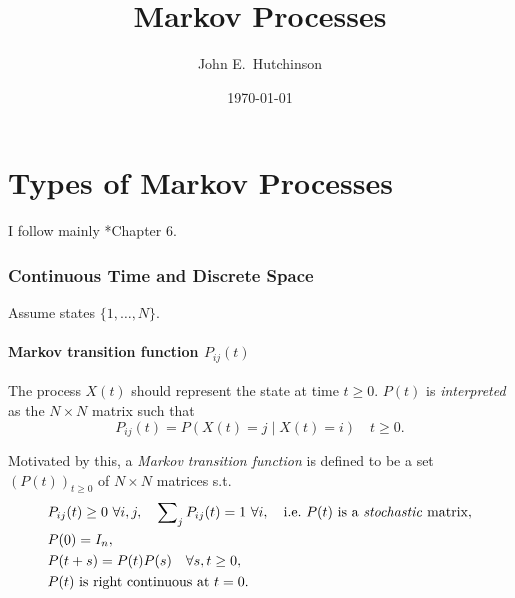 \documentclass[a4paper]{amsart}
\theoremstyle{plain}
\theoremstyle{definition}
\theoremstyle{remark}
\begin{document}
\title{Markov Processes}  
\author{John E.\ Hutchinson}
\date{\today}

\maketitle




\tableofcontents

\newpage \part{Types of Markov Processes}

I follow mainly \cite{Lam}*{Chapter  6}.

\section{\textbf{Continuous Time and Discrete Space}}

Assume states  $ \{1,\dots, N\}$. 

\subsection{Markov transition function $ P_{ij}(t) $ }
The process $ X(t) $ should represent the state at time $ t \geq 0 $.
$ P(t) $ is \emph{interpreted} as the $ N \times N $ matrix such that 
\begin{equation} \label{} 
P_{ij} (t) = P(X(t) = j \mid X(t) = i )\quad t \geq 0  .
\end{equation}


 
Motivated by this,  a \emph{Markov transition function } is defined to be a set $ (P(t))_{t\geq 0} $  of   $ N \times N $ matrices   s.t.
\begin{align}
& P_{ij}(t) \geq 0\ \forall i,j, \quad \sum\nolimits_j  P_{ij}(t) = 1 \ \forall i, \quad \text{i.e.\ $ P(t) $ is a \emph{stochastic} matrix},  \label{P1}\\
&P(0) = I_n, \label{P2}\\
&P(t+s) = P(t) P(s) \quad \forall s,t \geq 0, \label{P3}\\
& P(t) \text{ is right continuous at $ t =0 $}. \label{P4}
\end{align} 
 
\end{document}
